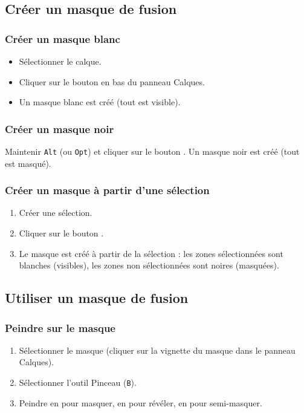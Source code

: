\subsection{Créer un masque de fusion}

\subsubsection{Créer un masque blanc}

\begin{itemize}
    \item Sélectionner le calque.
    \item Cliquer sur le bouton  en bas du panneau Calques.
    \item Un masque blanc est créé (tout est visible).
\end{itemize}

\subsubsection{Créer un masque noir}

Maintenir \texttt{Alt} (ou \texttt{Opt}) et cliquer sur le bouton . Un masque noir est créé (tout est masqué).

\subsubsection{Créer un masque à partir d'une sélection}

\begin{enumerate}
    \item Créer une sélection.
    \item Cliquer sur le bouton .
    \item Le masque est créé à partir de la sélection : les zones sélectionnées sont blanches (visibles), les zones non sélectionnées sont noires (masquées).
\end{enumerate}

\subsection{Utiliser un masque de fusion}

\subsubsection{Peindre sur le masque}

\begin{enumerate}
    \item Sélectionner le masque (cliquer sur la vignette du masque dans le panneau Calques).
    \item Sélectionner l'outil Pinceau (\texttt{B}).
    \item Peindre en  pour masquer, en  pour révéler, en  pour semi-masquer.
\end{enumerate}

